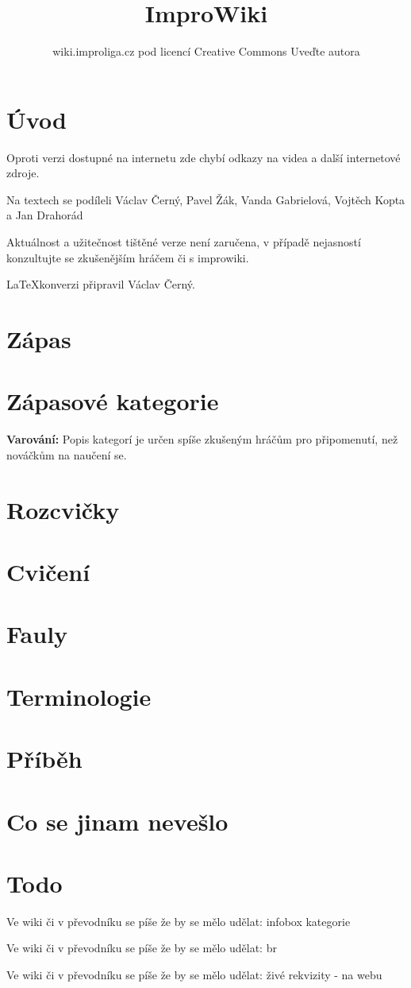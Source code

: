 \documentclass[a4paper,8pt]{book}
\title{ImproWiki}
\author{wiki.improliga.cz pod licencí Creative Commons Uveďte autora}
\newcommand{\todo}[1]{
Ve wiki či v převodníku se píše že by se mělo udělat: #1 
}
\begin{document}
\begin{titlepage}
\maketitle
\end{titlepage}
 
\chapter{Úvod}\label{úvod}


Oproti verzi dostupné na internetu zde chybí odkazy na videa a další internetové zdroje.

Na textech se podíleli Václav Černý, Pavel Žák, Vanda Gabrielová, Vojtěch Kopta a Jan Drahorád

Aktuálnost a užitečnost tištěné verze není zaručena, v případě nejasností konzultujte se zkušenějším hráčem či s improwiki.


\LaTeX konverzi připravil  Václav Černý. 
\chapter{Zápas}



\chapter{Zápasové kategorie}\label{zápasové kategorie}
\textbf{Varování:} Popis kategorí je určen spíše zkušeným hráčům pro připomenutí, než nováčkům na naučení se.  


\chapter{Rozcvičky}\label{rozcvičky}


\chapter{Cvičení}\label{cvičení}


\chapter{Fauly}\label{fauly}


\chapter{Terminologie}\label{terminologie}



\chapter{Příběh}\label{pribeh}


\chapter{Co se jinam nevešlo}\label{co se jinam nevešlo}

\chapter{Todo}
\todo{infobox kategorie}

\todo{br}

\todo{živé rekvizity - na webu}

\setcounter{tocdepth}{1}
\tableofcontents
\end{document}
